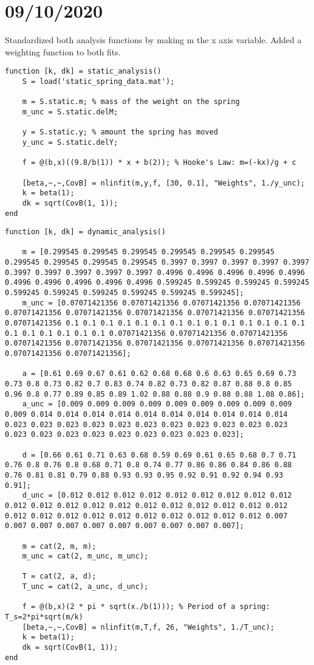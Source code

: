 \documentclass{article}
\begin{document}
    \section*{09/10/2020}
    Standardized both analysis functions by making m the x axis variable. Added a weighting function to both fits.
    \begin{lstlisting}
function [k, dk] = static_analysis()
    S = load('static_spring_data.mat');

    m = S.static.m; % mass of the weight on the spring
    m_unc = S.static.delM;

    y = S.static.y; % amount the spring has moved
    y_unc = S.static.delY;

    f = @(b,x)((9.8/b(1)) * x + b(2)); % Hooke's Law: m=(-kx)/g + c

    [beta,~,~,CovB] = nlinfit(m,y,f, [30, 0.1], "Weights", 1./y_unc);
    k = beta(1);
    dk = sqrt(CovB(1, 1));
end
    \end{lstlisting}
    \begin{lstlisting}
function [k, dk] = dynamic_analysis()

    m = [0.299545 0.299545 0.299545 0.299545 0.299545 0.299545 0.299545 0.299545 0.299545 0.299545 0.3997 0.3997 0.3997 0.3997 0.3997 0.3997 0.3997 0.3997 0.3997 0.3997 0.4996 0.4996 0.4996 0.4996 0.4996 0.4996 0.4996 0.4996 0.4996 0.4996 0.599245 0.599245 0.599245 0.599245 0.599245 0.599245 0.599245 0.599245 0.599245 0.599245];
    m_unc = [0.07071421356 0.07071421356 0.07071421356 0.07071421356 0.07071421356 0.07071421356 0.07071421356 0.07071421356 0.07071421356 0.07071421356 0.1 0.1 0.1 0.1 0.1 0.1 0.1 0.1 0.1 0.1 0.1 0.1 0.1 0.1 0.1 0.1 0.1 0.1 0.1 0.1 0.07071421356 0.07071421356 0.07071421356 0.07071421356 0.07071421356 0.07071421356 0.07071421356 0.07071421356 0.07071421356 0.07071421356];

    a = [0.61 0.69 0.67 0.61 0.62 0.68 0.68 0.6 0.63 0.65 0.69 0.73 0.73 0.8 0.73 0.82 0.7 0.83 0.74 0.82 0.73 0.82 0.87 0.88 0.8 0.85 0.96 0.8 0.77 0.89 0.85 0.89 1.02 0.88 0.88 0.9 0.88 0.88 1.08 0.86];
    a_unc = [0.009 0.009 0.009 0.009 0.009 0.009 0.009 0.009 0.009 0.009 0.014 0.014 0.014 0.014 0.014 0.014 0.014 0.014 0.014 0.014 0.023 0.023 0.023 0.023 0.023 0.023 0.023 0.023 0.023 0.023 0.023 0.023 0.023 0.023 0.023 0.023 0.023 0.023 0.023 0.023];

    d = [0.66 0.61 0.71 0.63 0.68 0.59 0.69 0.61 0.65 0.68 0.7 0.71 0.76 0.8 0.76 0.8 0.68 0.71 0.8 0.74 0.77 0.86 0.86 0.84 0.86 0.88 0.76 0.81 0.81 0.79 0.88 0.93 0.93 0.95 0.92 0.91 0.92 0.94 0.93 0.91];
    d_unc = [0.012 0.012 0.012 0.012 0.012 0.012 0.012 0.012 0.012 0.012 0.012 0.012 0.012 0.012 0.012 0.012 0.012 0.012 0.012 0.012 0.012 0.012 0.012 0.012 0.012 0.012 0.012 0.012 0.012 0.012 0.007 0.007 0.007 0.007 0.007 0.007 0.007 0.007 0.007 0.007];

    m = cat(2, m, m);
    m_unc = cat(2, m_unc, m_unc);

    T = cat(2, a, d);
    T_unc = cat(2, a_unc, d_unc);

    f = @(b,x)(2 * pi * sqrt(x./b(1))); % Period of a spring: T_s=2*pi*sqrt(m/k)
    [beta,~,~,CovB] = nlinfit(m,T,f, 26, "Weights", 1./T_unc);
    k = beta(1);
    dk = sqrt(CovB(1, 1));
end
    \end{lstlisting}
\end{document}
